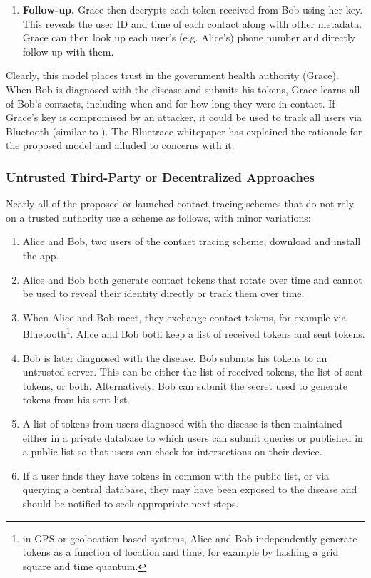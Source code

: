 {\begin{enumerate}
		\item\textbf{Follow-up.} Grace then decrypts each token received from Bob using her key. This reveals the user ID and time of each contact along with other metadata. Grace can then look up each user's (e.g. Alice's) phone number and directly follow up with them.
		
	\end{enumerate}
	
	Clearly, this model places trust in the government health authority (Grace). When Bob is diagnosed with the disease and submits his tokens, Grace learns all of Bob's contacts, including when and for how long they were in contact. If Grace's key is compromised by an attacker, it could be used to track all users via Bluetooth (similar to \cite{bluetooth-tracking}).
	The Bluetrace whitepaper has explained the rationale for the proposed model and alluded to concerns with it.
	
	
	
	\subsubsection{Untrusted Third-Party or Decentralized Approaches}
	
	Nearly all of the proposed or launched contact tracing schemes that do not rely on a trusted authority use a scheme as follows, with minor variations:
	
	\begin{enumerate}
		\item Alice and Bob, two users of the contact tracing scheme, download and install the app.
		\item Alice and Bob both generate contact tokens that rotate over time and cannot be used to reveal their identity directly or track them over time.
		\item When Alice and Bob meet, they exchange contact tokens, for example via Bluetooth\footnote{in GPS or geolocation based systems, Alice and Bob independently generate tokens as a function of location and time, for example by hashing a grid square and time quantum.}. Alice and Bob both keep a list of received tokens and sent tokens.
		\item Bob is later diagnosed with the disease. Bob submits his tokens to an untrusted server. This can be either the list of received tokens, the list of sent tokens, or both. Alternatively, Bob can submit the secret used to generate tokens from his sent list.
		\item A list of tokens from users diagnosed with the disease is then maintained either in a private database to which users can submit queries or published in a public list so that users can check for intersections on their device.
		\item If a user finds they have tokens in common with the public list, or via querying a central database, they may have been exposed to the disease and should be notified to seek appropriate next steps.
	\end{enumerate}
	
}
